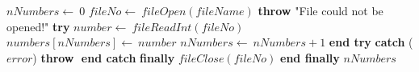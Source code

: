 \documentclass[a4paper,10pt]{article}
\begin{document}
\begin{algorithm}
\caption{readNumbers(fileName, numbers, maxNumbers)}
\begin{algorithmic}[5]

\STATE {}
\STATE {}
\STATE {}
  \STATE \(nNumbers\gets\ 0\)
  \STATE \(fileNo\gets\ fileOpen(fileName)\)
    \STATE \textbf{throw} \(\)"{}File could not be opened!"{}\(\)
  \ENDIF
  \STATE \textbf{try}  \BODY
      \STATE \(number\gets\ fileReadInt(fileNo)\)
      \STATE \(numbers[nNumbers]\gets\ number\)
      \STATE \(nNumbers\gets\ nNumbers+1\)
    \ENDWHILE
  \ENDBODY \STATE \textbf{end try}
  \STATE \textbf{catch} (\(error\)) \BODY
    \STATE \textbf{throw} \(\)
  \ENDBODY \STATE \textbf{end catch}
  \STATE \textbf{finally} \BODY
    \STATE \(fileClose(fileNo)\)
  \ENDBODY \STATE \textbf{end finally}
  \RETURN\(nNumbers\)

\end{algorithmic}
\end{algorithm}


\STATE {}
\end{document}
